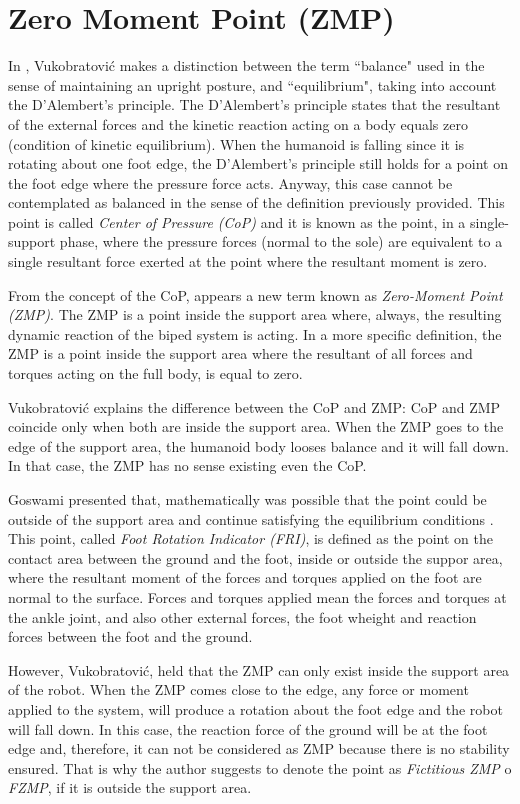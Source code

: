\section{Zero Moment Point (ZMP)}
In \cite{Vuk2007}, Vukobratović makes a distinction between the term ``balance" used in the sense of maintaining an upright posture, and ``equilibrium", taking into account the D'Alembert's principle. The D'Alembert's principle states that the resultant of the external forces and the kinetic reaction acting on a body equals zero (condition of kinetic equilibrium). When the humanoid is falling since it is rotating about one foot edge, the D’Alembert’s principle still holds for a point on the foot edge where the pressure force acts. Anyway, this case cannot be contemplated as balanced in the sense of the definition previously provided. This point is called \textit{Center of Pressure (CoP)} and it is known as the point, in a single-support phase, where the pressure forces (normal to the sole) are equivalent to a single resultant force exerted at the point where the resultant moment is zero.

From the concept of the CoP, appears a new term known as \textit{Zero-Moment Point (ZMP)}. The ZMP is a point inside the support area where, always, the resulting dynamic reaction of the biped system is acting. In a more specific definition, the ZMP is a point inside the support area where the resultant of all forces and torques acting on the full body, is equal to zero.

Vukobratović \cite{Vuk2007} explains the difference between the CoP and ZMP: CoP and ZMP coincide only when both are inside the support area. When the ZMP goes to the edge of the support area, the humanoid body looses balance and it will fall down. In that case, the ZMP has no sense existing even the CoP.

Goswami presented that, mathematically was possible that the point could be outside of the support area and continue satisfying the equilibrium conditions \cite{Gos}. This point, called \textit{Foot Rotation Indicator (FRI)}, is defined as the point on the contact area between the ground and the foot, inside or outside the suppor area, where the resultant moment of the forces and torques applied on the foot are normal to the surface. Forces and torques applied mean the forces and torques at the ankle joint, and also other external forces, the foot wheight and reaction forces between the foot and the ground. 

However, Vukobratović, held that the ZMP can only exist inside the support area of the robot. When the ZMP comes close to the edge, any force or moment applied to the system, will produce a rotation about the foot edge and the robot will fall down. In this case, the reaction force of the ground will be at the foot edge and, therefore, it can not be considered as ZMP because there is no stability ensured. That is why the author suggests to denote the point as \textit{Fictitious ZMP} o \textit{FZMP}, if it is outside the support area. 
 
